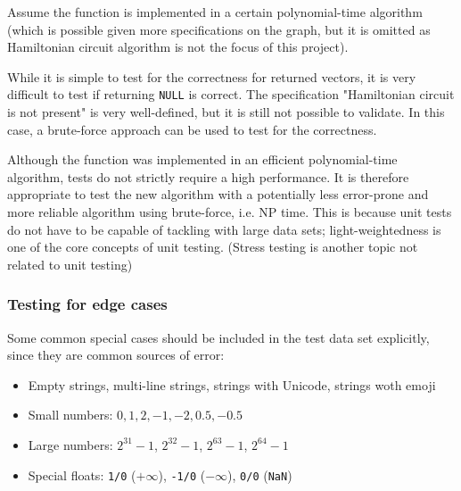Assume the function is implemented in a certain polynomial-time algorithm
(which is possible given more specifications on the graph,
but it is omitted as Hamiltonian circuit algorithm is not the focus of this project).

While it is simple to test for the correctness for returned vectors, it is very difficult to test if returning \texttt{NULL} is correct.
The specification "Hamiltonian circuit is not present" is very well-defined, but it is still not possible to validate.
In this case, a brute-force approach can be used to test for the correctness.

Although the function was implemented in an efficient polynomial-time algorithm, tests do not strictly require a high performance.
It is therefore appropriate to test the new algorithm
with a potentially less error-prone and more reliable algorithm using brute-force, i.e. NP time.
This is because unit tests do not have to be capable of tackling with large data sets;
light-weightedness is one of the core concepts of unit testing.
(Stress testing is another topic not related to unit testing)

\subsubsection{Testing for edge cases}
Some common special cases should be included in the test data set explicitly, since they are common sources of error:

\begin{itemize}
	\item Empty strings, multi-line strings, strings with Unicode, strings woth emoji
	\item Small numbers: $0, 1, 2, -1, -2, 0.5, -0.5$
	\item Large numbers: $2^{31}-1$, $2^{32}-1$, $2^{63}-1$, $2^{64}-1$
	\item Special floats: \texttt{1/0} ($+\infty$), \texttt{-1/0} ($-\infty$), \texttt{0/0} (\texttt{NaN})
\end{itemize}
